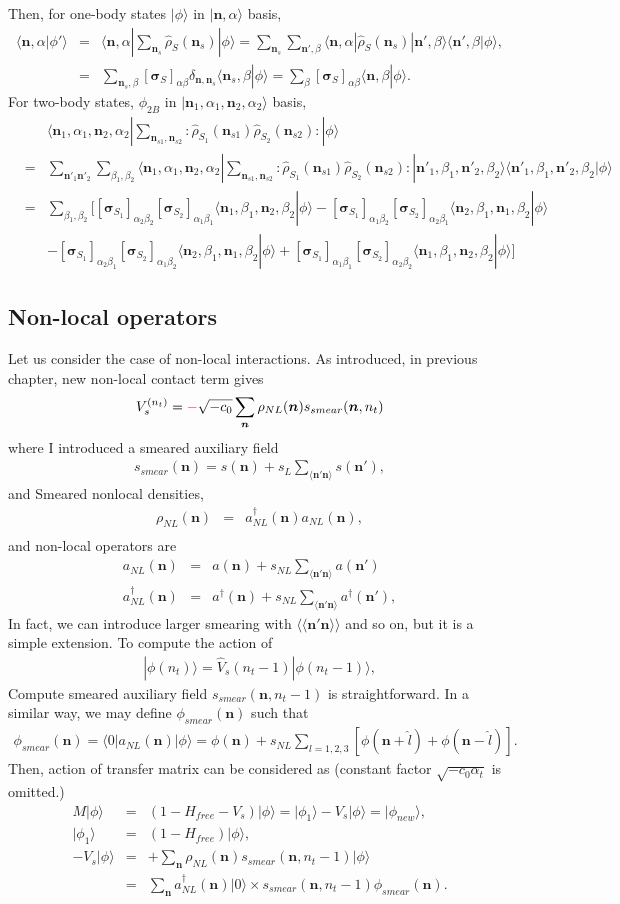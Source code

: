\documentclass[10pt]{book}
\def\bm{\boldsymbol}
\newcommand{\bea}{\begin{eqnarray}}
\newcommand{\eea}{\end{eqnarray}}
\newcommand{\no}{\nonumber \\}
\def\vs{{\bm \sigma}}
\def\vn{{\bm n}}
\def\la{\langle}
\def\ra{\rangle}
\begin{document}
Then, for one-body states $|\phi\ra$ in $|\vn, \alpha \ra $ basis, 
\bea 
\la \vn,\alpha|\phi'\ra &=& 
\la \vn,\alpha| \sum_{\vn_s} \hat{\rho}_{S}(\vn_s)|\phi\ra 
= \sum_{\vn_s} \sum_{\vn',\beta}\la \vn,\alpha| \hat{\rho}_{S}(\vn_s)|\vn',\beta\ra 
  \la \vn',\beta   |\phi\ra ,\no  
&=&\sum_{\vn_s,\beta} [\vs_S]_{\alpha\beta} \delta_{\vn,\vn_s}\la \vn_s,\beta|\phi\ra
 =\sum_{\beta} [\vs_S]_{\alpha\beta}\la \vn,\beta|\phi\ra. 
\eea 
For two-body states, $\phi_{2B}$ in $|\vn_1,\alpha_1,\vn_2,\alpha_2\ra $ basis,
\bea 
& &\la \vn_1,\alpha_1,\vn_2,\alpha_2| \sum_{\vn_{s1},\vn_{s2}} 
       : \hat{\rho}_{S_1}(\vn_{s1})\hat{\rho}_{S_2}(\vn_{s2}):|\phi\ra \no 
&=& \sum_{\vn'_1\vn'_2}\sum_{\beta_1,\beta_2} 
    \la \vn_1,\alpha_1,\vn_2,\alpha_2| \sum_{\vn_{s1},\vn_{s2}} 
            :\hat{\rho}_{S_1}(\vn_{s1})\hat{\rho}_{S_2}(\vn_{s2}):
      |\vn'_1,\beta_1,\vn'_2,\beta_2\ra  
      \la \vn'_1,\beta_1,\vn'_2,\beta_2|\phi\ra \no 
&=& \sum_{\beta_1,\beta_2} \Big[ 
    [\vs_{S_1}]_{\alpha_2\beta_2}[\vs_{S_2}]_{\alpha_1\beta_1}
    \la \vn_1,\beta_1,\vn_2,\beta_2|\phi\ra 
   -[\vs_{S_1}]_{\alpha_1\beta_2}[\vs_{S_2}]_{\alpha_2\beta_1}
   \la \vn_2,\beta_1,\vn_1,\beta_2|\phi\ra 
    \no & & 
   -[\vs_{S_1}]_{\alpha_2\beta_1}[\vs_{S_2}]_{\alpha_1\beta_2}
      \la \vn_2,\beta_1,\vn_1,\beta_2|\phi\ra
   +[\vs_{S_1}]_{\alpha_1\beta_1}[\vs_{S_2}]_{\alpha_2\beta_2}
      \la \vn_1,\beta_1,\vn_2,\beta_2|\phi\ra   \Big]
\eea  

\subsection{Non-local operators} 
Let us consider the case of non-local interactions. As introduced, in previous chapter, 
new non-local contact term gives 
\bea 
V_{s}^{(n_t)}={\color{red}-}\sqrt{-c_0}\sum_{\vn}\rho_{NL}(\vn)s_{smear}(\vn,n_t)
\eea 
where I introduced a smeared auxiliary field 
\bea 
s_{smear}(\vn)=s(\vn)+s_L \sum_{\la \vn'\vn\ra } s(\vn'),
\eea 
and Smeared nonlocal densities,
\bea 
\rho_{NL}(\vn)&=&a^\dagger_{NL}(\vn)a_{NL}(\vn), \no 
\eea 
and non-local operators are
\bea 
a_{NL}(\vn)&=&a(\vn)+s_{NL}\sum_{\la \vn' \vn\ra } a(\vn')\no 
a^\dagger_{NL}(\vn)&=&a^\dagger(\vn)+s_{NL}\sum_{\la \vn' \vn\ra } a^\dagger(\vn'),
\eea 
In fact, we can introduce larger smearing with $\la\la \vn'\vn\ra\ra$ and so on, but 
it is a simple extension.  
To compute the action of 
\bea 
|\phi(n_t)\ra =\hat{V}_s(n_t-1)|\phi(n_t-1)\ra, 
\eea 
Compute smeared auxiliary field $s_{smear}(\vn,n_t-1)$
is straightforward. In a similar way, 
we may define $\phi_{smear}(\vn)$ such that 
\bea 
\phi_{smear}(\vn)=\la 0| a_{NL}(\vn)|\phi\ra 
                 =\phi(\vn)+s_{NL}\sum_{l=1,2,3} \left[\phi(\vn+\hat{l})+\phi(\vn-\hat{l})\right].
\eea 
Then, action of transfer matrix can be considered as (constant factor $\sqrt{-c_0\alpha_t}$ is omitted.)
\bea 
M|\phi\ra &=&\left(1-H_{free}-V_{s}\right)|\phi\ra 
          =|\phi_1\ra-V_{s}|\phi\ra =|\phi_{new}\ra, \no  
|\phi_1\ra &=& (1-H_{free})|\phi\ra ,\no 
-V_{s}|\phi\ra&=&+\sum_{\vn}\rho_{NL}(\vn)s_{smear}(\vn,n_t-1)|\phi\ra \no 
              &=& \sum_{\vn} a^\dagger_{NL}(\vn)|0\ra \times s_{smear}(\vn,n_t-1) \phi_{smear}(\vn).
\eea 
\end{document}
